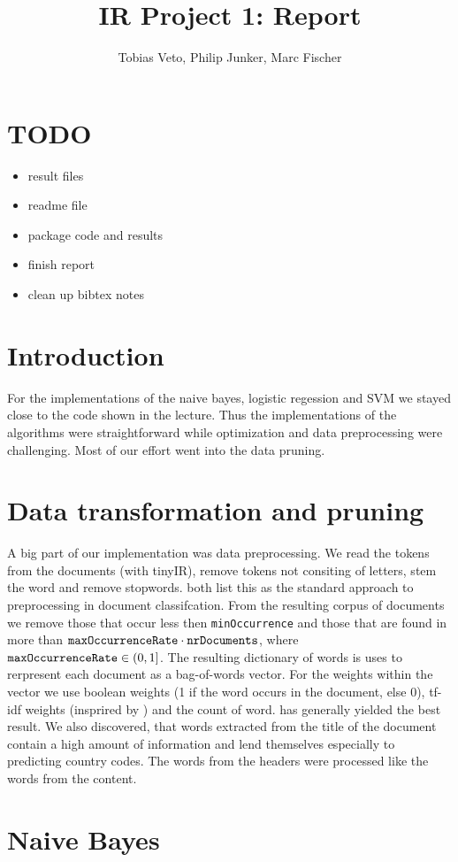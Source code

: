 \documentclass{article}
\title{IR Project 1: Report}
\author{Tobias Veto, Philip Junker, Marc Fischer}
\begin{document}
\section*{TODO}
\begin{itemize}
	\item result files
	\item readme file
	\item package code and results
	\item finish report
	\item clean up bibtex notes
\end{itemize}

 
\section*{Introduction}
For the implementations of the naive bayes, logistic regession and SVM we stayed close to the code shown in the lecture. Thus the implementations of the algorithms were straightforward while optimization and data preprocessing were challenging. Most of our effort went into the data pruning.


\section*{Data transformation and pruning}
A big part of our implementation was data preprocessing. We read the tokens from the documents (with tinyIR), remove tokens not consiting of letters, stem the word and remove stopwords. \cite{joachims_text_1998,ozgur_text_2005} both list this as the standard approach to preprocessing in document classifcation. From the resulting corpus of documents we remove those that occur less then \texttt{minOccurrence} and those that are found in more than $\text{\texttt{maxOccurrenceRate}} \cdot \text{\texttt{nrDocuments}}$, where $\text{\texttt{maxOccurrenceRate}} \in (0, 1]$.
The resulting dictionary of words is uses to rerpresent each document as a bag-of-words vector. For the weights within the vector we use boolean weights (1 if the word occurs in the document, else 0), tf-idf weights (insprired by \cite{ozgur_text_2005}) and the count of word.   has generally yielded the best result.
We also discovered, that words extracted from the title of the document contain a high amount of information and lend themselves especially to predicting country codes. The words from the headers were processed like the words from the content.

\section*{Naive Bayes}
\lipsum[1-4] %
\end{document}
